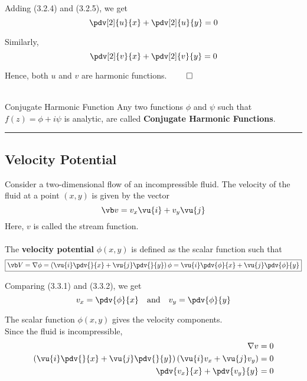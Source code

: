 Adding (3.2.4) and (3.2.5), we get
\begin{equation}
    \pdv[2]{u}{x} + \pdv[2]{u}{y} = 0
\end{equation}

Similarly,
\begin{equation}
    \pdv[2]{v}{x} + \pdv[2]{v}{y} = 0
\end{equation}

Hence, both $u$ and $v$ are harmonic functions. \hfill $\qed$ \\~\\

\begin{definition}{Conjugate Harmonic Function}{}
    Any two functions $\phi$ and $\psi$ such that $f(z) = \phi + i\psi$ is analytic, are called \textbf{Conjugate Harmonic Functions}.
\end{definition}

\vspace{20pt}\rule{3in}{1pt}


\subsection{Velocity Potential}
Consider a two-dimensional flow of an incompressible fluid. The velocity of the fluid at a point $(x,y)$ is given by the vector
\begin{equation}
    \vb v = v_x \vu{i} + v_y \vu{j}
\end{equation}
Here, $v$ is called the stream function. \\~\\

The \textbf{velocity potential} $\phi(x,y)$ is defined as the scalar function such that
\begin{equation}
    \boxed{ \vb V = \nabla \phi = \left( \vu{i} \pdv{}{x} + \vu{j} \pdv{}{y} \right) \phi = \vu{i} \pdv{\phi}{x} + \vu{j} \pdv{\phi}{y} }
\end{equation}

Comparing (3.3.1) and (3.3.2), we get
\begin{equation}
    v_x = \pdv{\phi}{x} \quad \text{and} \quad v_y = \pdv{\phi}{y}
\end{equation}

The scalar function $\phi(x,y)$ gives the velocity components. \\
Since the fluid is incompressible,
\begin{align*}
    \nabla v &= 0 \\
    \left( \vu{i} \pdv{}{x} + \vu{j} \pdv{}{y} \right) \left( \vu{i} v_x + \vu{j} v_y \right) &= 0 \\
    \pdv{v_x}{x} + \pdv{v_y}{y} &= 0
\end{align*}

